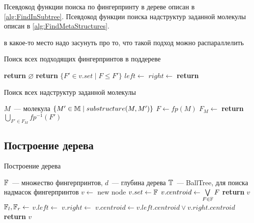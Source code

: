 Псевдокод функции поиска по фингерпринту в дереве описан в \ref{alg:FindInSubtree}. 
Псевдокод функции поиска надструктур заданной молекулы описан в \ref{alg:FindMetaStructures}. 

{\color{red} в какое-то место надо засунуть про то, что такой подход можно распараллелить}

\begin{algorithm}
  \caption{Поиск всех подходящих фингерпринтов в поддереве}\label{alg:FindInSubtree}
  \begin{algorithmic}[1]
     \label{alg:FindInSubtree:line:RecursionCut}
      \State \textbf{return} $\varnothing$
      \State \textbf{return} $\{F' \in v.set \mid F \le F' \}$ 
    \Else
      \State $left \gets $   
      \State $right \gets $  
      \State \textbf{return}  
    \EndIf
    \EndProcedure
  \end{algorithmic}
\end{algorithm}

\begin{algorithm}
  \caption{Поиск всех надструктур заданной молекулы} \label{alg:FindMetaStructures}
  \begin{algorithmic}[1]
    \Require $M $~--- молекула 
    \Ensure $\{M' \in \mathbb{M} \mid substructure(M, M') \}$ 
    \State $F \gets fp(M) $ 
    \State $F_M \gets $ 
    \State \textbf{return} $\bigcup\limits_{F' \in F_M} fp^{-1}(F')$  
    \EndProcedure
  \end{algorithmic}
\end{algorithm}

\subsection{Построение дерева}

\begin{algorithm}
  \caption{Построение дерева} \label{alg:BuildTree}
  \begin{algorithmic}[1]
    \Require $\mathbb{F}$~--- множество фингерпринтов, $d $~--- глубина дерева
    \Ensure $\mathbb{T} $~--- BallTree, для поиска надмасок фингерпринтов 
      \State $v \gets$ new node
        
	\State $v.set \gets \mathbb{F}$ 
	\State $v.centroid \gets \bigvee\limits_{F \in \mathbb{F}} F$ 
	\State \textbf{return} $v$ 
      \Else 
        \State $\mathbb{F}_l, \mathbb{F}_r \gets $ 
        \State $v.left \gets $  
	\State $v.right \gets $ 
	\State $v.centroid \gets v.left.centroid \lor v.right.centroid$ 
        \State \textbf{return} $v$ 
      \EndIf
    \EndProcedure
  \end{algorithmic}
\end{algorithm}

